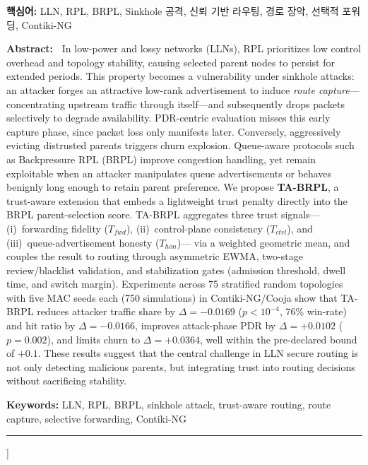 \documentclass[10pt,a4paper,twocolumn]{article}
\newcommand{\enabstract}[1]{%
  \small\textbf{Abstract:~}#1\par}
\begin{document}
{\begin{center}
\begin{minipage}{0.96\textwidth}
\noindent\textbf{핵심어:}
LLN, RPL, BRPL, Sinkhole 공격, 신뢰 기반 라우팅, 경로 장악, 선택적 포워딩, Contiki-NG
\end{minipage}

\vspace{6pt}

\begin{minipage}{0.96\textwidth}
\enabstract{%
In low-power and lossy networks (LLNs), RPL prioritizes low control overhead and topology
stability, causing selected parent nodes to persist for extended periods.
This property becomes a vulnerability under sinkhole attacks:
an attacker forges an attractive low-rank advertisement to induce
\emph{route capture}---concentrating upstream traffic through itself---and subsequently
drops packets selectively to degrade availability.
PDR-centric evaluation misses this early capture phase, since packet loss only manifests later.
Conversely, aggressively evicting distrusted parents triggers churn explosion.
Queue-aware protocols such as Backpressure RPL (BRPL) improve congestion handling,
yet remain exploitable when an attacker manipulates queue advertisements or behaves benignly
long enough to retain parent preference.
We propose \textbf{TA-BRPL}, a trust-aware extension that embeds a lightweight trust penalty
directly into the BRPL parent-selection score.
TA-BRPL aggregates three trust signals---(i)~forwarding fidelity ($T_{fwd}$),
(ii)~control-plane consistency ($T_{ctrl}$), and (iii)~queue-advertisement honesty ($T_{hon}$)---%
via a weighted geometric mean, and couples the result to routing
through asymmetric EWMA, two-stage review/blacklist validation, and stabilization gates
(admission threshold, dwell time, and switch margin).
Experiments across 75 stratified random topologies with five MAC seeds each
(750 simulations) in Contiki-NG/Cooja show that TA-BRPL reduces attacker traffic share
by $\Delta = -0.0169$ ($p < 10^{-4}$, 76\% win-rate) and hit ratio by $\Delta = -0.0166$,
improves attack-phase PDR by $\Delta = +0.0102$ ($p = 0.002$),
and limits churn to $\Delta = +0.0364$, well within the pre-declared bound of $+0.1$.
These results suggest that the central challenge in LLN secure routing is not only detecting
malicious parents, but integrating trust into routing decisions without sacrificing stability.}
\vspace{4pt}

\noindent\textbf{Keywords:}
LLN, RPL, BRPL, sinkhole attack, trust-aware routing, route capture,
selective forwarding, Contiki-NG
\end{minipage}

\vspace{8pt}\hrule\vspace{10pt}
\end{center}
}]  %
\end{document}
